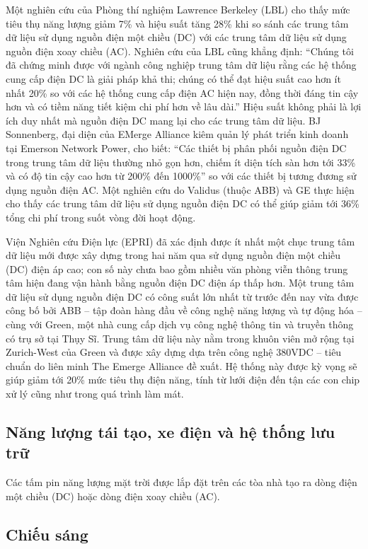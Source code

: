 \documentclass{thesis}
\begin{document}
Một nghiên cứu của Phòng thí nghiệm Lawrence Berkeley (LBL) cho thấy
mức tiêu thụ năng lượng giảm 7\% và hiệu suất tăng 28\% khi so sánh
các trung tâm dữ liệu sử dụng nguồn điện một chiều (DC) với các trung
tâm dữ liệu sử dụng nguồn điện xoay chiều (AC). Nghiên cứu của LBL
cũng khẳng định: “Chúng tôi đã chứng minh được với ngành công nghiệp
trung tâm dữ liệu rằng các hệ thống cung cấp điện DC là giải pháp khả
thi; chúng có thể đạt hiệu suất cao hơn ít nhất 20\% so với các hệ
thống cung cấp điện AC hiện nay, đồng thời đáng tin cậy hơn và có
tiềm năng tiết kiệm chi phí hơn về lâu dài.” Hiệu suất không phải là
lợi ích duy nhất mà nguồn điện DC mang lại cho các trung tâm dữ liệu.
BJ Sonnenberg, đại diện của EMerge Alliance kiêm quản lý phát triển
kinh doanh tại Emerson Network Power, cho biết: “Các thiết bị phân
phối nguồn điện DC trong trung tâm dữ liệu thường nhỏ gọn hơn, chiếm
ít diện tích sàn hơn tới 33\% và có độ tin cậy cao hơn từ 200\% đến
1000\%” so với các thiết bị tương đương sử dụng nguồn điện AC. Một
nghiên cứu do Validus (thuộc ABB) và GE thực hiện cho thấy các trung
tâm dữ liệu sử dụng nguồn điện DC có thể giúp giảm tới 36\% tổng chi
phí trong suốt vòng đời hoạt động.

Viện Nghiên cứu Điện lực (EPRI) đã xác định được ít nhất một chục
trung tâm dữ liệu mới được xây dựng trong hai năm qua sử dụng nguồn
điện một chiều (DC) điện áp cao; con số này chưa bao gồm nhiều văn
phòng viễn thông trung tâm hiện đang vận hành bằng nguồn điện DC điện
áp thấp hơn. Một trung tâm dữ liệu sử dụng nguồn điện DC có công suất
lớn nhất từ trước đến nay vừa được công bố bởi ABB – tập đoàn hàng
đầu về công nghệ năng lượng và tự động hóa – cùng với Green, một nhà
cung cấp dịch vụ công nghệ thông tin và truyền thông có trụ sở tại
Thụy Sĩ. Trung tâm dữ liệu này nằm trong khuôn viên mở rộng tại
Zurich-West của Green và được xây dựng dựa trên công nghệ 380VDC –
tiêu chuẩn do liên minh The Emerge Alliance đề xuất. Hệ thống này
được kỳ vọng sẽ giúp giảm tới 20\% mức tiêu thụ điện năng, tính từ
lưới điện đến tận các con chip xử lý cũng như trong quá trình làm mát.

\subsection{Năng lượng tái tạo, xe điện và hệ thống lưu trữ}

Các tấm pin năng lượng mặt trời được lắp đặt trên các tòa nhà tạo ra
dòng điện một chiều (DC) hoặc dòng điện xoay chiều (AC).

\subsection{Chiếu sáng}
\end{document}
